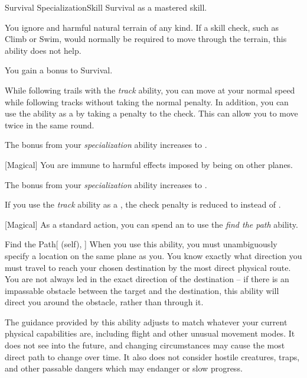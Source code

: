     \begin{feat}{Survival Specialization}{Skill}
        \featpre Survival as a mastered skill.

         You ignore  and harmful natural terrain of any kind.
        If a skill check, such as Climb or Swim, would normally be required to move through the terrain, this ability does not help.

         You gain a  bonus to Survival.

        While following trails with the \textit{track} ability, you can move at your normal speed while following tracks without taking the normal  penalty.
        In addition, you can use the ability as a  by taking a  penalty to the check.
        This can allow you to move twice in the same round.

         The bonus from your \textit{specialization} ability increases to .

        [Magical] You are immune to harmful effects imposed by being on other planes.

         The bonus from your \textit{specialization} ability increases to .

         If you use the \textit{track} ability as a , the check penalty is reduced to  instead of .

        [Magical] As a standard action, you can spend an  to use the \textit{find the path} ability.
        \begin{ability}{Find the Path}[ (self), ]
            When you use this ability, you must unambiguously specify a location on the same plane as you.
            You know exactly what direction you must travel to reach your chosen destination by the most direct physical route.
            You are not always led in the exact direction of the destination -- if there is an impassable obstacle between the target and the destination, this ability will direct you around the obstacle, rather than through it.

            The guidance provided by this ability adjusts to match whatever your current physical capabilities are, including flight and other unusual movement modes. It does not see into the future, and changing circumstances may cause the most direct path to change over time.
            It also does not consider hostile creatures, traps, and other passable dangers which may endanger or slow progress.
        \end{ability}
    \end{feat}

